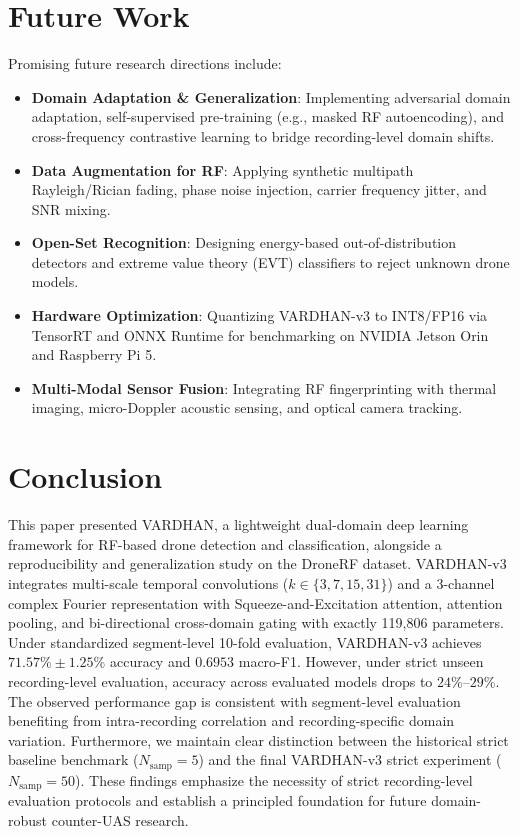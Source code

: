 \documentclass[journal,10pt,twocolumn]{IEEEtran}
\begin{document}
\section{Future Work}
Promising future research directions include:
\begin{itemize}
    \item \textbf{Domain Adaptation \& Generalization}: Implementing adversarial domain adaptation, self-supervised pre-training (e.g., masked RF autoencoding), and cross-frequency contrastive learning to bridge recording-level domain shifts.
    \item \textbf{Data Augmentation for RF}: Applying synthetic multipath Rayleigh/Rician fading, phase noise injection, carrier frequency jitter, and SNR mixing.
    \item \textbf{Open-Set Recognition}: Designing energy-based out-of-distribution detectors and extreme value theory (EVT) classifiers to reject unknown drone models.
    \item \textbf{Hardware Optimization}: Quantizing VARDHAN-v3 to INT8/FP16 via TensorRT and ONNX Runtime for benchmarking on NVIDIA Jetson Orin and Raspberry Pi 5.
    \item \textbf{Multi-Modal Sensor Fusion}: Integrating RF fingerprinting with thermal imaging, micro-Doppler acoustic sensing, and optical camera tracking.
\end{itemize}

\section{Conclusion}
This paper presented VARDHAN, a lightweight dual-domain deep learning framework for RF-based drone detection and classification, alongside a reproducibility and generalization study on the DroneRF dataset. VARDHAN-v3 integrates multi-scale temporal convolutions ($k \in \{3, 7, 15, 31\}$) and a 3-channel complex Fourier representation with Squeeze-and-Excitation attention, attention pooling, and bi-directional cross-domain gating with exactly 119,806 parameters. Under standardized segment-level 10-fold evaluation, VARDHAN-v3 achieves $71.57\% \pm 1.25\%$ accuracy and $0.6953$ macro-F1. However, under strict unseen recording-level evaluation, accuracy across evaluated models drops to $24\%\text{--}29\%$. The observed performance gap is consistent with segment-level evaluation benefiting from intra-recording correlation and recording-specific domain variation. Furthermore, we maintain clear distinction between the historical strict baseline benchmark ($N_{\text{samp}}=5$) and the final VARDHAN-v3 strict experiment ($N_{\text{samp}}=50$). These findings emphasize the necessity of strict recording-level evaluation protocols and establish a principled foundation for future domain-robust counter-UAS research.



\end{document}
